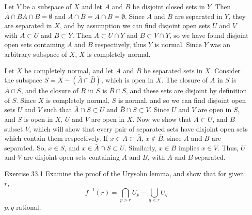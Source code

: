\documentclass{hmwk}
\begin{document}
\begin{solution}
    
    \pre Let $Y$ be a subspace of $X$ and let $A$ and $B$ be disjoint closed sets in $Y$. Then $\bar{A} \cap B A \cap B = \emptyset$ and $A \cap \bar{B} = A \cap B = \emptyset$. Since $A$ and $B$ are separated in $Y$, they are separated in $X$, and by assumption we can find disjoint open sets $U$ and $V$ with $A \subset U$ and $B \subset Y$. Then $A \subset U \cap Y$ and $B \subset V \cap Y$, so we have found disjoint open sets containing $A$ and $B$ respectively, thus $Y$ is normal. Since $Y$ was an arbitrary subspace of $X$, $X$ is completely normal. 

    \pre Let $X$ be completely normal, and let $A$ and $B$ be separated sets in $X$. Consider the subspace $S = X - (\bar{A} \cap \bar{B})$, which is open in $X$. The closure of $A$ in $S$ is $\bar{A} \cap S$, and the closure of $B$ in $S$ is $\bar{B} \cap S$, and these sets are disjoint by definition of $S$. Since $X$ is completely normal, $S$ is normal, and so we can find disjoint open sets $U$ and $V$ such that $\bar{A} \cap S \subset U$ and $\bar{B} \cap S \subset V$. Since $U$ and $V$ are open in $S$, and $S$ is open in $X$, $U$ and $V$ are open in $X$. Now we show that $A \subset U$, and $B$ subset $V$, which will show that every pair of separated sets have disjoint open sets which contain them respectively. If $x \in A \subset \bar{A}$, $x \notin \bar{B}$, since $A$ and $B$ are separated. So, $x \in S$, and $x \in \bar{A} \cap S \subset U$. Similarly, $x \in B$ implies $x \in V$. Thus, $U$ and $V$ are disjoint open sets containing $A$ and $B$, with $A$ and $B$ separated. 
\end{solution}

\begin{problem}{Exercise 33.1}
    Examine the proof of the Urysohn lemma, and show that for given $r$,
    $$f^{-1}(r) = \bigcap_{p > r} U_p - \bigcup_{q < r}U_q$$
    $p, q$ rational. 
\end{problem}
\end{document}
